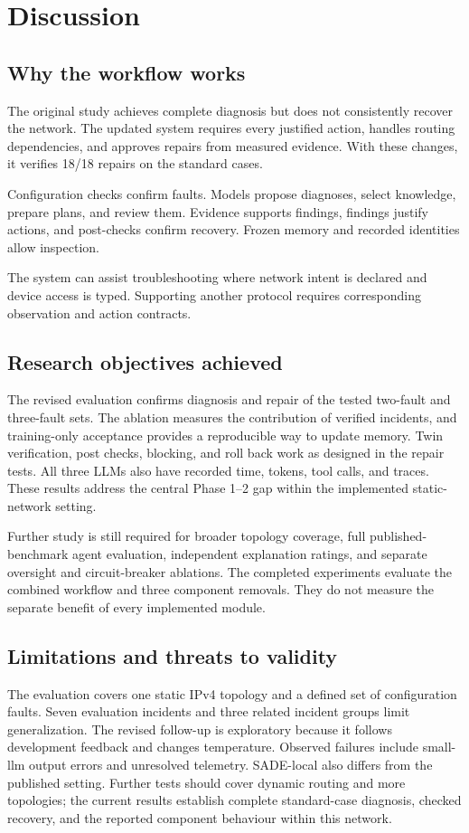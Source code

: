 \documentclass[pdflatex,sn-mathphys-num,iicol]{sn-jnl}
\begin{document}
\section{Discussion}\label{sec:discussion}
\subsection{Why the workflow works}
The original study achieves complete diagnosis but does not consistently recover the network. The updated system requires every justified action, handles routing dependencies, and approves repairs from measured evidence. With these changes, it verifies 18/18 repairs on the standard cases.

Configuration checks confirm faults. Models propose diagnoses, select knowledge, prepare plans, and review them. Evidence supports findings, findings justify actions, and post-checks confirm recovery. Frozen memory and recorded identities allow inspection.

The system can assist troubleshooting where network intent is declared and device access is typed. Supporting another protocol requires corresponding observation and action contracts.

\subsection{Research objectives achieved}
The revised evaluation confirms diagnosis and repair of the tested two-fault and three-fault sets. The ablation measures the contribution of verified incidents, and training-only acceptance provides a reproducible way to update memory. Twin verification, post checks, blocking, and roll back work as designed in the repair tests. All three LLMs also have recorded time, tokens, tool calls, and traces. These results address the central Phase 1--2 gap within the implemented static-network setting.

Further study is still required for broader topology coverage, full published-benchmark agent evaluation, independent explanation ratings, and separate oversight and circuit-breaker ablations. The completed experiments evaluate the combined workflow and three component removals. They do not measure the separate benefit of every implemented module.

\subsection{Limitations and threats to validity}
The evaluation covers one static IPv4 topology and a defined set of configuration faults. Seven evaluation incidents and three related incident groups limit generalization. The revised follow-up is exploratory because it follows development feedback and changes temperature. Observed failures include small-llm output errors and unresolved telemetry. SADE-local also differs from the published setting. Further tests should cover dynamic routing and more topologies; the current results establish complete standard-case diagnosis, checked recovery, and the reported component behaviour within this network.
\end{document}
